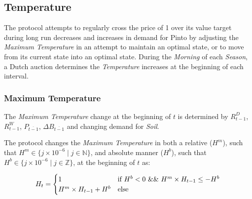 \documentclass[tikz]{article}
\newcommand{\term}[1]{\textsl{#1}}
\newcommand{\Pinto}{} %
\renewcommand{\Pinto}{\usebox{\cachePinto}}
\begin{document}

\newpage

\subsection{Temperature}
\vspace*{1.4mm}

The protocol attempts to regularly cross the price of \Pinto1 over its value target during long run decreases and increases in demand for Pinto by adjusting the \term{Maximum Temperature} in an attempt to maintain an optimal state, or to move from its current state into an optimal state. During the \term{Morning} of each \term{Season}, a Dutch auction determines the \term{Temperature} increases at the beginning of each interval. 


\vspace*{1.4mm}
\subsubsection{Maximum Temperature}\label{sec:maximum-temperature}
\vspace*{1.4mm}

The \term{Maximum Temperature} change at the beginning of $t$ is determined by $R_{t-1}^{D}$, $R_{t-1}^{W}$, $P_{\overline{t-1}}$, $\Delta B_{\overline{t-1}}$ and changing demand for \term{Soil}.

\vspace*{1.4mm}

\begin{samepage}
The protocol changes the \term{Maximum Temperature} in both a relative ($H^{m}$), such that $H^{m} \in \{j \times 10^{-6} \mid j \in \mathbb{N} \}$, and absolute manner ($H^{b}$), such that $H^{b} \in \{j \times 10^{-6} \mid j \in \mathbb{Z} \}$, at the beginning of $t$ as:

\vspace*{1.4mm}

    $$
        H_t =
        \begin{cases}
            1 & \text{if } H^{b}<0 \mkern6mu \&\& \mkern6mu H^{m} \times H_{t-1}\leq-H^{b}\\
            H^{m} \times H_{t-1}+H^{b} & \text{else}
        \end{cases}
    $$
\end{samepage}
\end{document}

